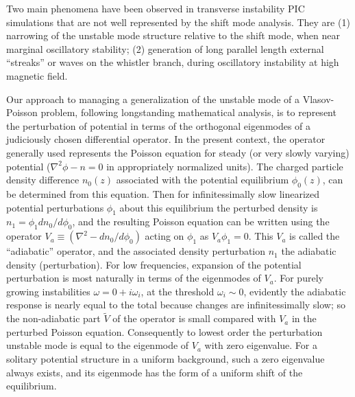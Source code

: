 \documentclass[12pt]{article}
\begin{document}
Two main phenomena have been observed in transverse instability PIC
simulations that are not well represented by the shift mode
analysis. They are (1) narrowing of the unstable mode structure
relative to the shift mode, when near marginal oscillatory
stability\cite{Hutchinson2019}; (2) generation of long parallel length
external ``streaks'' or waves on the whistler branch, during
oscillatory instability at high magnetic field\cite{Hutchinson2019a}.

Our approach to managing a generalization of the unstable mode of a
Vlasov-Poisson problem, following longstanding mathematical
analysis\cite{Lewis1979}, is to represent the perturbation of
potential in terms of the orthogonal eigenmodes of a judiciously
chosen differential operator. In the present context, the operator
generally used\cite{Lewis1982} represents the Poisson equation for
steady (or very slowly varying) potential ($\nabla^2\phi-n=0$ in
appropriately normalized units). The charged particle density
difference $n_0(z)$ associated with the potential equilibrium
$\phi_0(z)$, can be determined from this equation. Then for
infinitessimally slow linearized potential perturbations $\phi_1$
about this equilibrium the perturbed density is
$n_1=\phi_1dn_0/d\phi_0$, and the resulting Poisson equation can be
written using the operator $V_a \equiv(\nabla^2-dn_0/d\phi_0)$ acting
on $\phi_1$ as $V_a\phi_1=0$. This $V_a$ is called the ``adiabatic''
operator, and the associated density perturbation $n_1$ the adiabatic
density (perturbation). For low frequencies, expansion of the
potential perturbation is most naturally in terms of the eigenmodes of
$V_a$. For purely growing instabilities $\omega=0+i\omega_i$, at the
threshold $\omega_i\sim 0$, evidently the adiabatic response is nearly
equal to the total because changes are infinitessimally slow; so the
non-adiabatic part $\tilde V$ of the operator is small compared with
$V_a$ in the perturbed Poisson equation. Consequently to lowest order
the perturbation unstable mode is equal to the eigenmode of $V_a$ with
zero eigenvalue. For a solitary potential structure in a uniform
background, such a zero eigenvalue always exists, and its eigenmode
has the form of a uniform shift of the equilibrium.
\end{document}
